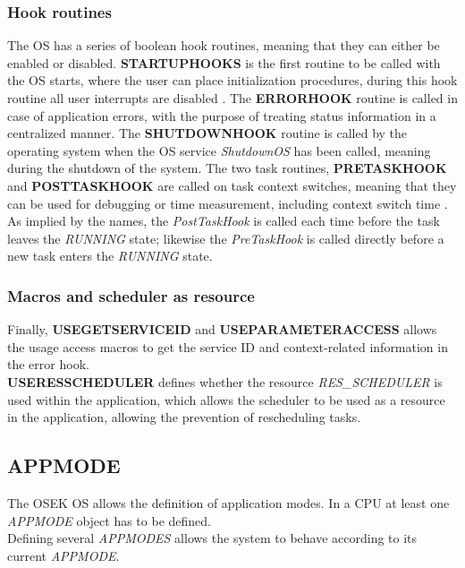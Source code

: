 \subsubsection*{Hook routines}
The OS has a series of boolean hook routines, meaning that they can either be enabled or disabled. 
\textbf{STARTUPHOOKS} is the first routine to be called with the OS starts, where the user can place initialization procedures, during this hook routine all user interrupts are disabled \cite{irisa223}.
The \textbf{ERRORHOOK} routine is called in case of application errors, with the purpose of treating status information in a centralized manner. 
The \textbf{SHUTDOWNHOOK} routine is called by the operating system when the OS service \textit{ShutdownOS} has been called, meaning during the shutdown of the system. 
The two task routines, \textbf{PRETASKHOOK} and \textbf{POSTTASKHOOK} are called on task context switches, meaning that they can be used for debugging or time measurement, including context switch time \cite{irisa223}.
As implied by the names, the \textit{PostTaskHook} is called each time before the task leaves the \textit{RUNNING} state; likewise the \textit{PreTaskHook} is called directly before a new task enters the \textit{RUNNING} state\cite{irisa223}.

\subsubsection*{Macros and scheduler as resource}
Finally, \textbf{USEGETSERVICEID} and \textbf{USEPARAMETERACCESS} allows the usage access macros to get the service ID and context-related information in the error hook.\\
\textbf{USERESSCHEDULER} defines whether the resource \textit{RES\_SCHEDULER} is used within the application, which allows the scheduler to be used as a resource in the application, allowing the prevention of rescheduling tasks\cite{irisa223}.

\subsection{APPMODE}
The OSEK OS allows the definition of application modes.
In a CPU at least one \textit{APPMODE} object has to be defined.\\
Defining several \textit{APPMODES} allows the system to behave according to its current \textit{APPMODE}\cite{irisa25}.

